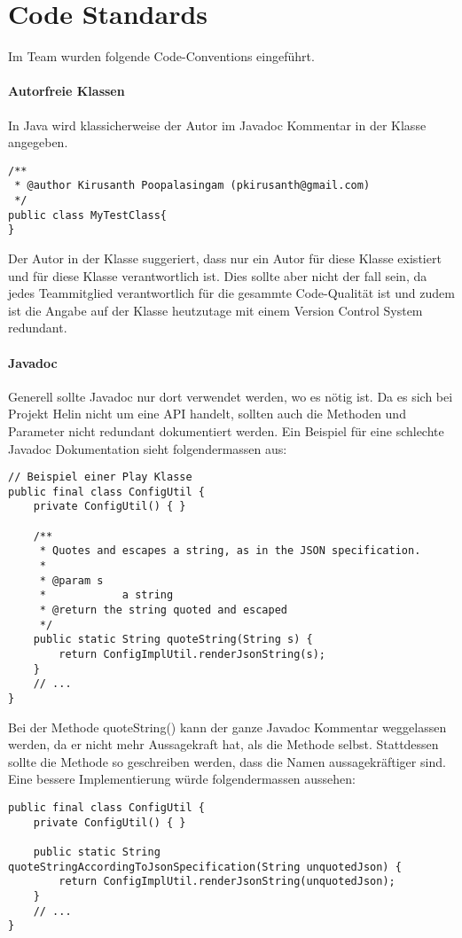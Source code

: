 \chapter{Code Standards}
Im Team wurden folgende Code-Conventions eingeführt.

\subsubsection{Autorfreie Klassen}
In Java wird klassicherweise der Autor im Javadoc Kommentar in der Klasse angegeben.

\begin{lstlisting}
/**
 * @author Kirusanth Poopalasingam (pkirusanth@gmail.com)
 */
public class MyTestClass{
}
\end{lstlisting}
Der Autor in der Klasse suggeriert, dass nur ein Autor für diese Klasse existiert und für diese Klasse verantwortlich ist. Dies sollte aber nicht der fall sein, da jedes Teammitglied verantwortlich für die gesammte Code-Qualität ist und zudem ist die Angabe auf der Klasse heutzutage mit einem Version Control System redundant.

\subsubsection{Javadoc}
Generell sollte Javadoc nur dort verwendet werden, wo es nötig ist. Da es sich bei Projekt Helin nicht um eine API handelt, sollten auch die Methoden und Parameter nicht redundant dokumentiert werden. Ein Beispiel für eine schlechte Javadoc Dokumentation sieht folgendermassen aus:
\begin{lstlisting}
// Beispiel einer Play Klasse
public final class ConfigUtil {
    private ConfigUtil() { }

    /**
     * Quotes and escapes a string, as in the JSON specification.
     *
     * @param s
     *            a string
     * @return the string quoted and escaped
     */
    public static String quoteString(String s) {
        return ConfigImplUtil.renderJsonString(s);
    }
    // ...
}
\end{lstlisting}
Bei der Methode quoteString() kann der ganze Javadoc Kommentar weggelassen werden, da er nicht mehr Aussagekraft hat, als die Methode selbst. Stattdessen sollte die Methode so geschreiben werden, dass die Namen aussagekräftiger sind.
\\
Eine bessere Implementierung würde folgendermassen aussehen:
\begin{lstlisting}
public final class ConfigUtil {
    private ConfigUtil() { }

    public static String quoteStringAccordingToJsonSpecification(String unquotedJson) {
        return ConfigImplUtil.renderJsonString(unquotedJson);
    }
    // ...
}
\end{lstlisting}
